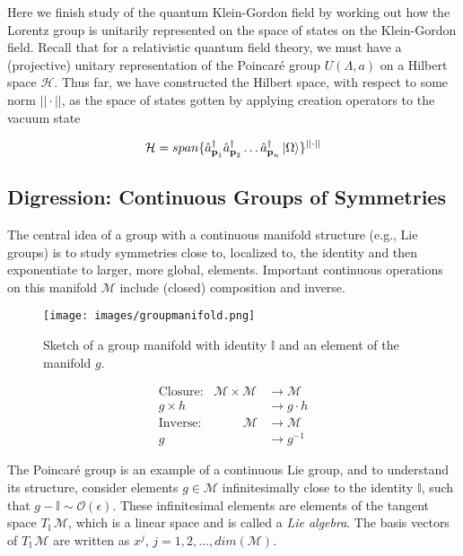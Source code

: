 \noindent Here we finish study of the quantum Klein-Gordon field by working out how the Lorentz group is unitarily represented on the space of states on the Klein-Gordon field. Recall that for a relativistic quantum field theory, we must have a (projective) unitary representation of the Poincar\'e group $U(\Lambda, a)$ on a Hilbert space $\mathcal{H}$. Thus far, we have constructed the Hilbert space, with respect to some norm $|| \cdot ||$, as the space of states gotten by applying creation operators to the vacuum state

\begin{equation}
\mathcal{H} = span \{ \hat{a}_{\textbf{p}_1}^\dagger \hat{a}_{\textbf{p}_2}^\dagger \dots \hat{a}_{\textbf{p}_n}^\dagger \ket{\Omega} \} ^{||\cdot||}
\end{equation}

\subsection*{Digression: Continuous Groups of Symmetries}

\noindent The central idea of a group with a continuous manifold structure (e.g., Lie groups) is to study symmetries close to, localized to, the identity and then exponentiate to larger, more global, elements. Important continuous operations on this manifold $\mathcal{M}$ include (closed) composition and inverse. \\

\begin{figure}[H]
	\centering
	\texttt{[image: images/groupmanifold.png]}
	\caption{Sketch of a group manifold with identity $\mathbb{I}$ and an element of the manifold $g$.}
\end{figure}

\begin{align}
\text{Closure:} \,\,\,\,\, \mathcal{M} \times \mathcal{M} &\rightarrow \mathcal{M} \\
g \times h &\rightarrow g \cdot h \\
\text{Inverse:} \,\,\,\,\,\,\,\,\,\,\,\,\,\,\,\,\,\,\,\, \mathcal{M} &\rightarrow \mathcal{M} \\
g &\rightarrow g^{-1}
\end{align}

\noindent The Poincar\'e group is an example of a continuous Lie group, and to understand its structure, consider elements $g \in \mathcal{M}$ infinitesimally close to the identity $\mathbb{I}$, such that $g - \mathbb{I} \sim \mathcal{O}(\epsilon)$. These infinitesimal elements are elements of the tangent space $T_{\mathbb{I}} \, \mathcal{M}$, which is a linear space and is called a \textit{Lie algebra}. The basis vectors of $T_{\mathbb{I}} \, \mathcal{M}$ are written as $x^j$, $j=1,2,\dots,dim(\mathcal{M})$.

